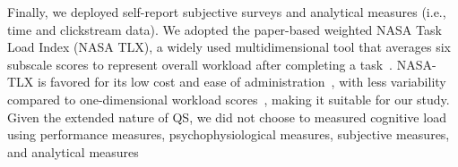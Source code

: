 Finally, we deployed self-report subjective surveys and analytical measures (i.e., time and clickstream data). We adopted the paper-based weighted NASA Task Load Index (NASA TLX), a widely used multidimensional tool that averages six subscale scores to represent overall workload after completing a task~\cite{hart1988development, hartNasaTaskLoadIndex2006, cain2007review}. NASA-TLX is favored for its low cost and ease of administration~\cite{gaoMentalWorkloadMeasurement2013}, with less variability compared to one-dimensional workload scores~\cite{rubioEvaluationSubjectiveMental2004}, making it suitable for our study. Given the extended nature of QS, we did not choose to measured cognitive load using performance measures, psychophysiological measures, subjective measures, and analytical measures~\cite{gaoMentalWorkloadMeasurement2013}







